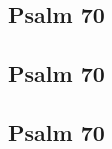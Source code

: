 \begin{multicols}{3}
\begin{center}
\quad{}\quad{}
\end{center}

\subsection*{Psalm 70}

\begin{center}
\quad{}\quad{}
\end{center}

\subsection*{Psalm 70}

\begin{center}
\quad{}\quad{}
\end{center}

\subsection*{Psalm 70}

\begin{center}
\quad{}\quad{}
\end{center}

\end{multicols}

\begin{center}
\Large{}
\end{center}
\begin{multicols}{3}

\end{multicols}

\begin{center}
\Large{}
\end{center}
\begin{multicols}{3}


\end{multicols}

